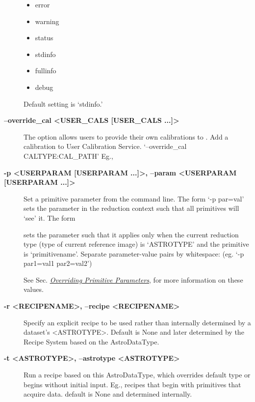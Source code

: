\documentclass[letterpaper,10pt,english]{sphinxmanual}
\begin{document}
\begin{description}
\begin{itemize}
\item {} 
error

\item {} 
warning

\item {} 
status

\item {} 
stdinfo

\item {} 
fullinfo

\item {} 
debug

\end{itemize}

Default setting is `stdinfo.'

\item[{\textbf{--override\_cal \textless{}USER\_CALS {[}USER\_CALS ...{]}\textgreater{}}}] \leavevmode
The option allows users to provide their own calibrations to .
Add a calibration to User Calibration Service.
`--override\_cal CALTYPE:CAL\_PATH'
Eg.,


\item[{\textbf{-p \textless{}USERPARAM {[}USERPARAM ...{]}\textgreater{}, --param \textless{}USERPARAM {[}USERPARAM ...{]}\textgreater{}}}] \leavevmode
Set a primitive parameter from the command line. The form `-p par=val' sets
the parameter in the reduction context such that all primitives will `see' it.
The form


sets the parameter such that it applies only when the current reduction type
(type of current reference image) is `ASTROTYPE' and the primitive is
`primitivename'. Separate parameter-value pairs by whitespace:
(eg. `-p par1=val1 par2=val2')

See Sec. {\hyperref[interfaces:userpars]{\emph{Overriding Primitive Parameters}}}, for more information on these values.

\item[{\textbf{-r \textless{}RECIPENAME\textgreater{}, --recipe \textless{}RECIPENAME\textgreater{}}}] \leavevmode
Specify an explicit recipe to be used rather than internally determined by
a dataset's \textless{}ASTROTYPE\textgreater{}. Default is None and later determined by the Recipe
System based on the AstroDataType.

\item[{\textbf{-t \textless{}ASTROTYPE\textgreater{}, --astrotype \textless{}ASTROTYPE\textgreater{}}}] \leavevmode
Run a recipe based on this AstroDataType, which overrides default type or
begins without initial input. Eg., recipes that begin with primitives that
acquire data.  default is None and determined internally.


\end{description}
\end{document}

